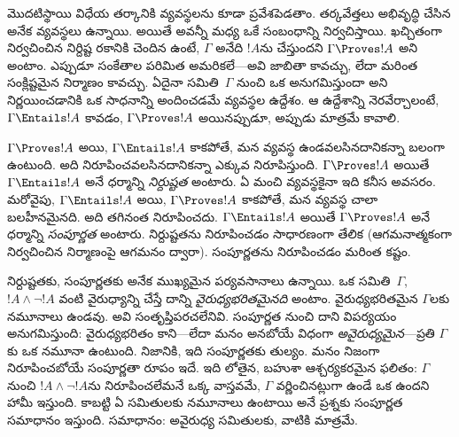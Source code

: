 \documentclass[../../../include/open-logic-section]{subfiles}
\begin{document}


మొదటిస్థాయి విధేయ తర్కానికి  వ్యవస్థలను కూడా ప్రవేశపెడతాం.
తర్కవేత్తలు అభివృద్ధి చేసిన అనేక  వ్యవస్థలు
ఉన్నాయి. అయితే అవన్నీ  మధ్య ఒకే 
సంబంధాన్ని నిర్వచిస్తాయి. ఖచ్చితంగా నిర్వచించిన నిర్దిష్ట రకానికి చెందిన
 ఉంటే, $\Gamma$ అనేది $!A$ను \emph{}
చేస్తుందని $\Gamma \Proves !A$ అని అంటాం.  ఎప్పుడూ
సంకేతాల పరిమిత అమరికలే---అవి  జాబితా కావచ్చు, లేదా
మరింత సంక్లిష్టమైన నిర్మాణం కావచ్చు. ఏదైనా సమితి~$\Gamma$ నుంచి ఒక
 అనుగమిస్తుందా అని నిర్ణయించడానికి ఒక సాధనాన్ని
అందించడమే  వ్యవస్థల ఉద్దేశం. ఆ ఉద్దేశాన్ని నెరవేర్చాలంటే,
$\Gamma \Entails !A$ కావడం, $\Gamma \Proves !A$ అయినప్పుడూ, అప్పుడు
మాత్రమే కావాలి.

$\Gamma \Proves !A$ అయి, $\Gamma \Entails !A$ కాకపోతే, మన
 వ్యవస్థ ఉండవలసినదానికన్నా బలంగా ఉంటుంది. అది నిరూపించవలసినదానికన్నా
ఎక్కువ నిరూపిస్తుంది. $\Gamma \Proves !A$ అయితే $\Gamma \Entails !A$ అనే
ధర్మాన్ని \emph{నిర్దుష్టత} అంటారు. ఏ మంచి  వ్యవస్థకైనా
ఇది కనీస అవసరం. మరోవైపు, $\Gamma \Entails !A$ అయి, $\Gamma
\Proves !A$ కాకపోతే, మన  వ్యవస్థ చాలా బలహీనమైనది. అది
తగినంత నిరూపించదు. $\Gamma \Entails !A$ అయితే $\Gamma \Proves !A$
అనే ధర్మాన్ని \emph{సంపూర్ణత} అంటారు. నిర్దుష్టతను నిరూపించడం
సాధారణంగా తేలిక (ఆగమనాత్మకంగా నిర్వచించిన
 నిర్మాణంపై ఆగమనం ద్వారా). సంపూర్ణతను నిరూపించడం
మరింత కష్టం.

నిర్దుష్టతకు, సంపూర్ణతకు అనేక ముఖ్యమైన పర్యవసానాలు ఉన్నాయి. ఒక
 సమితి~$\Gamma$, $!A \land \lnot !A$ వంటి వైరుధ్యాన్ని
 చేస్తే దాన్ని \emph{వైరుధ్యభరితమైనది} అంటాం. వైరుధ్యభరితమైన
$\Gamma$లకు నమూనాలు ఉండవు. అవి సంతృప్తిపరచలేనివి. సంపూర్ణత నుంచి
దాని విపర్యయం అనుగమిస్తుంది: వైరుధ్యభరితం కాని---లేదా మనం అనబోయే విధంగా
\emph{అవైరుధ్యమైన}---ప్రతి $\Gamma$కు ఒక నమూనా ఉంటుంది. నిజానికి,
ఇది సంపూర్ణతకు తుల్యం. మనం నిజంగా నిరూపించబోయే సంపూర్ణతా రూపం
ఇదే. ఇది లోతైన, బహుశా ఆశ్చర్యకరమైన ఫలితం: $\Gamma$ నుంచి
$!A \land \lnot !A$ను నిరూపించలేమనే ఒక్క వాస్తవమే, $\Gamma$
వర్ణించినట్లుగా ఉండే ఒక  ఉందని హామీ ఇస్తుంది. కాబట్టి
ఏ  సమితులకు నమూనాలు ఉంటాయి అనే ప్రశ్నకు సంపూర్ణత
సమాధానం ఇస్తుంది. సమాధానం: అవైరుధ్య సమితులకు, వాటికి మాత్రమే.
\end{document}
